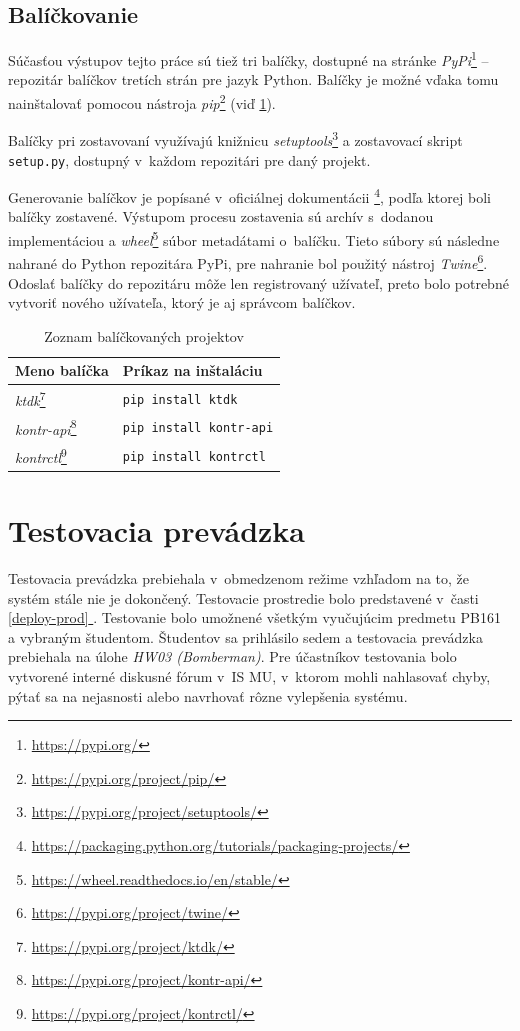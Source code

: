 \documentclass[
  digital, %
  oneside, %
  table,   %
  lof,     %
  lot,   %
]{fithesis3}
\newcommand*{\fullref}[1]{\hyperref[{#1}]{\ref*{#1} \nameref*{#1}}}
\newcommand*{\footurl}[1]{\footnote{\url{#1}}}
\begin{document}
\section{Balíčkovanie}

Súčasťou výstupov tejto práce sú tiež tri balíčky, dostupné na stránke \emph{PyPi}\footurl{https://pypi.org/} -- repozitár balíčkov tretích strán pre jazyk Python. Balíčky je možné vďaka tomu nainštalovať pomocou nástroja \emph{pip}\footurl{https://pypi.org/project/pip/} (viď \ref{tab:packages}).

Balíčky pri zostavovaní využívajú knižnicu \emph{setuptools}\footurl{https://pypi.org/project/setuptools/} a zostavovací skript \texttt{setup.py}, dostupný v~každom repozitári pre daný projekt.

Generovanie balíčkov je popísané v~oficiálnej dokumentácii \footurl{https://packaging.python.org/tutorials/packaging-projects/}, podľa ktorej boli balíčky zostavené. Výstupom procesu zostavenia sú archív s~dodanou implementáciou a \emph{wheel}\footurl{https://wheel.readthedocs.io/en/stable/} súbor metadátami o~balíčku. Tieto súbory sú následne nahrané do Python repozitára PyPi, pre nahranie bol použitý nástroj \emph{Twine}\footurl{https://pypi.org/project/twine/}. Odoslať balíčky do repozitáru môže len registrovaný užívateľ, preto bolo potrebné vytvoriť nového užívateľa, ktorý je aj správcom balíčkov.

\begin{table}[h]
\begin{tabular}{l l}
Meno balíčka & Príkaz na inštaláciu  \\ [0.5ex] 
\hline
\emph{ktdk}\footurl{https://pypi.org/project/ktdk/} & \texttt{pip install ktdk}  \\
\emph{kontr-api}\footurl{https://pypi.org/project/kontr-api/} & \texttt{pip install kontr-api}  \\
\emph{kontrctl}\footurl{https://pypi.org/project/kontrctl/} &  \texttt{pip install kontrctl} \\
\end{tabular}
\caption{Zoznam balíčkovaných projektov} \label{tab:packages}
\end{table}


\chapter{Testovacia prevádzka}

Testovacia prevádzka prebiehala v~obmedzenom režime vzhľadom na to, že systém stále nie je dokončený. Testovacie prostredie bolo predstavené v~časti \fullref{deploy-prod}. Testovanie bolo umožnené všetkým vyučujúcim predmetu PB161 a vybraným študentom. Študentov sa prihlásilo sedem a testovacia prevádzka prebiehala na úlohe \emph{HW03 (Bomberman)}. Pre účastníkov testovania bolo vytvorené interné diskusné fórum v~IS MU, v~ktorom mohli nahlasovať chyby, pýtať sa na nejasnosti alebo navrhovať rôzne vylepšenia systému.
\end{document}
